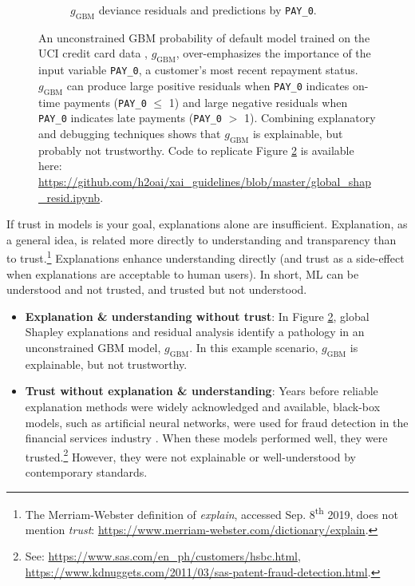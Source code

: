 \documentclass[sigconf]{acmart}
\begin{document}
\begin{figure}[htb!]
\begin{subfigure}{.5\textwidth}
  		\caption{$g_{\text{GBM}}$ deviance residuals and predictions by \texttt{PAY\_0}.}
  		\label{fig:resid}
	\end{subfigure}
	\vspace{-8pt}
	\caption{An unconstrained GBM probability of default model trained on the UCI credit card data \cite{uci}, $g_{\text{GBM}}$, over-emphasizes the importance of the input variable \texttt{PAY\_0}, a customer's most recent repayment status. $g_{\text{GBM}}$ can produce large positive residuals when \texttt{PAY\_0} indicates on-time payments (\texttt{PAY\_0} $\leq$ 1) and large negative residuals when \texttt{PAY\_0} indicates late payments (\texttt{PAY\_0} $>$ 1). Combining explanatory and debugging techniques shows that $g_{\text{GBM}}$ is explainable, but probably not trustworthy. Code to replicate Figure \ref{fig:global_shap_resid} is available here: \url{https://github.com/h2oai/xai_guidelines/blob/master/global_shap_resid.ipynb}.} 
	\label{fig:global_shap_resid}
\end{figure}

If trust in models is your goal, explanations alone are insufficient. Explanation, as a general idea, is related more directly to understanding and transparency than to trust.\footnote{The Merriam-Webster definition of \textit{explain}, accessed Sep. 8\textsuperscript{th} 2019, does not mention \textit{trust}: \url{https://www.merriam-webster.com/dictionary/explain}.} Explanations enhance understanding directly (and trust as a side-effect when explanations are acceptable to human users). In short, ML can be understood and not trusted, and trusted but not understood.
\begin{itemize}
\item \textbf{Explanation \& understanding without trust}: In Figure \ref{fig:global_shap_resid}, global Shapley explanations and residual analysis identify a pathology in an unconstrained GBM model, $g_{\text{GBM}}$. In this example scenario, $g_{\text{GBM}}$ is explainable, but not trustworthy. 
\item \textbf{Trust without explanation \& understanding}: Years before reliable explanation methods were widely acknowledged and available, black-box models, such as artificial neural networks, were used for fraud detection in the financial services industry \cite{gopinathan1998fraud}. When these models performed well, they were trusted.\footnote{See: \url{https://www.sas.com/en_ph/customers/hsbc.html}, \url{https://www.kdnuggets.com/2011/03/sas-patent-fraud-detection.html}.} However, they were not explainable or well-understood by contemporary standards.  
\end{itemize}
\end{document}
